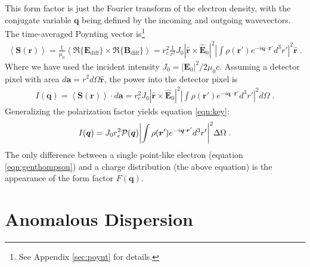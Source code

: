 \documentclass[12pt]{article}
\renewcommand{\vec}[1]{\boldsymbol{#1}}
\newcommand{\hvec}[1]{\hat{\vec{#1}}}
\newcommand{\avg}[1]{\left\langle #1 \right\rangle}
\begin{document}
This form factor is just the Fourier transform of the electron density, with the conjugate variable $\vec{q}$ being defined by the incoming and outgoing wavevectors.  The time-averaged Poynting vector is\footnote{See Appendix \ref{sec:poynt} for details.}
\begin{align}
\avg{\vec{S}(\vec{r})} = \frac{1}{\mu_0}\avg{
\Re\{\vec{E}_{\text{diff}}\}\times\Re\{\vec{B}_{\text{diff}}\}} = r_e^2 
\frac{1}{r^2} J_0 | \hvec{r} \times  \hvec{E}_0 |^2 \left| \int \rho(\vec{r}') 
e^{-i\vec{q}\cdot\vec{r}'} d^3r' \right|^2 \hvec{r} \;.
\end{align}
Where we have used the incident intensity $J_0 = |\vec{E}_0|^2/2\mu_0c$.  
Assuming a detector pixel with area $d\vec{a} = r^2 d\Omega \hvec{r}$, the power 
into the detector pixel is
\begin{align}
I(\vec{q}) = \avg{\vec{S}(\vec{r})} \cdot d\vec{a} = r_e^2 J_0 | \hvec{r} \times 
 \hvec{E}_0 |^2 \left| \int \rho(\vec{r}') e^{-i\vec{q}\cdot\vec{r}'} d^3r' 
\right|^2 d\Omega\;.
\end{align}
Generalizing the polarization factor yields equation \ref{eqn:key}:
\begin{align}\label{eqn:keyF}
    I(\vec{q}) = J_0 r_e^2  \mathcal{P}(\vec{q})  
\abs{\int \rho(\vec{r}') e^{-i\vec{q}\cdot\vec{r}'} d^3r'}^2 \Delta \Omega \;.
\end{align}
The only difference between a single point-like electron (equation  
\ref{eqn:genthompson}) and a charge distribution (the above equation) is the 
appearance of the form factor $F(\vec{q})$.   


\section{Anomalous Dispersion}
\end{document}
